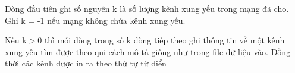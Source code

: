 Dòng đầu tiên ghi số nguyên k là số lượng kênh xung yếu trong mạng đã cho. Ghi k = -1 nếu mạng không chứa kênh xung yếu.

Nếu k$>$0 thì mỗi dòng trong số k dòng tiếp theo ghi thông tin về một kênh xung yếu tìm được theo qui cách mô tả giống như trong file dữ liệu vào. Đồng thời các kênh được in ra theo thứ tự từ điển